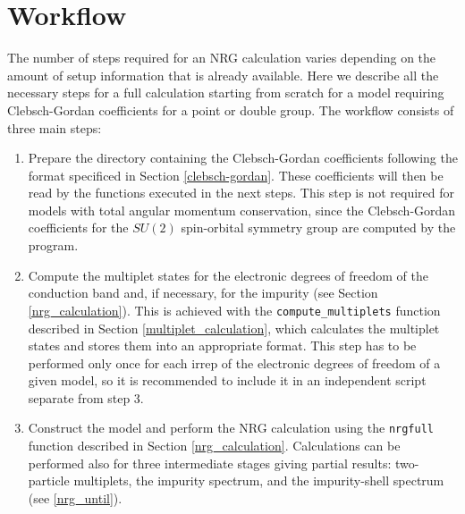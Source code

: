 \documentclass[notitlepage]{article}
\begin{document}
\section{Workflow}\label{workflow}
The number of steps required for an NRG calculation varies
depending on the amount of setup information that is already
available. Here we describe all the necessary steps for a
full calculation starting from scratch for a model requiring
Clebsch-Gordan coefficients for a point or double group.
The workflow consists of three main steps:
\begin{enumerate}
    \item Prepare the directory containing the
        Clebsch-Gordan coefficients following the format
        specificed in Section \ref{clebsch-gordan}. These
        coefficients will then be read by the functions
        executed in the next steps. This step is not
        required for models with total angular momentum
        conservation, since the Clebsch-Gordan coefficients
        for the $SU(2)$ spin-orbital symmetry group are
        computed by the program.
    \item Compute the multiplet states for the electronic
        degrees of freedom of the conduction band and, if
        necessary, for the impurity (see Section
        \ref{nrg_calculation}). This is achieved with the
        \texttt{compute\_multiplets} function described in
        Section \ref{multiplet_calculation}, which
        calculates the multiplet states and stores them into
        an appropriate format. This step has to be performed
        only once for each irrep of the electronic degrees
        of freedom of a given model, so it is recommended to
        include it in an independent script separate from
        step 3.
    \item Construct the model and perform the NRG
        calculation using the \texttt{nrgfull} function
        described in Section \ref{nrg_calculation}.
        Calculations can be performed also for three
        intermediate stages giving partial results:
        two-particle multiplets, the impurity spectrum, and
        the impurity-shell spectrum (see \ref{nrg_until}).
\end{enumerate}
\end{document}
